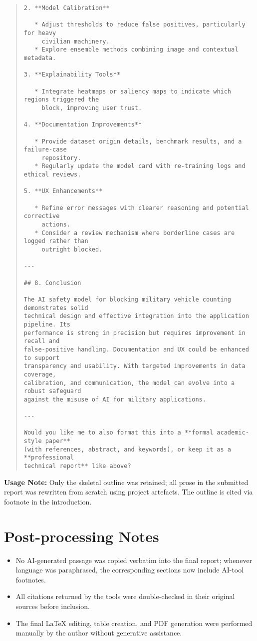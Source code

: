 \documentclass[11pt]{article}
\begin{document}
\begin{quote}
\begin{verbatim}
2. **Model Calibration**

   * Adjust thresholds to reduce false positives, particularly for heavy
     civilian machinery.
   * Explore ensemble methods combining image and contextual metadata.

3. **Explainability Tools**

   * Integrate heatmaps or saliency maps to indicate which regions triggered the
     block, improving user trust.

4. **Documentation Improvements**

   * Provide dataset origin details, benchmark results, and a failure-case
     repository.
   * Regularly update the model card with re-training logs and ethical reviews.

5. **UX Enhancements**

   * Refine error messages with clearer reasoning and potential corrective
     actions.
   * Consider a review mechanism where borderline cases are logged rather than
     outright blocked.

---

## 8. Conclusion

The AI safety model for blocking military vehicle counting demonstrates solid
technical design and effective integration into the application pipeline. Its
performance is strong in precision but requires improvement in recall and
false-positive handling. Documentation and UX could be enhanced to support
transparency and usability. With targeted improvements in data coverage,
calibration, and communication, the model can evolve into a robust safeguard
against the misuse of AI for military applications.

---

Would you like me to also format this into a **formal academic-style paper**
(with references, abstract, and keywords), or keep it as a **professional
technical report** like above?
\end{verbatim}
\end{quote}
\textbf{Usage Note:} Only the skeletal outline was retained; all prose in the submitted report was rewritten from scratch using project artefacts. The outline is cited via footnote in the introduction.

\section*{Post-processing Notes}
\begin{itemize}[leftmargin=*]
  \item No AI-generated passage was copied verbatim into the final report; whenever language was paraphrased, the corresponding sections now include AI-tool footnotes.
  \item All citations returned by the tools were double-checked in their original sources before inclusion.
  \item The final LaTeX editing, table creation, and PDF generation were performed manually by the author without generative assistance.
\end{itemize}
\end{document}
